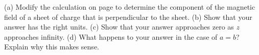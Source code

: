 (a) Modify the calculation on page \pageref{sheetofcurrent} to determine the
        component of the magnetic field of a sheet of charge that is perpendicular to the
        sheet.\answercheck\hwendpart
        (b) Show that your answer has the right units.\hwendpart
        (c) Show that your answer approaches zero as $z$ approaches infinity.\hwendpart
        (d) What happens to your answer in the case of $a=b$? Explain why this
        makes sense.
